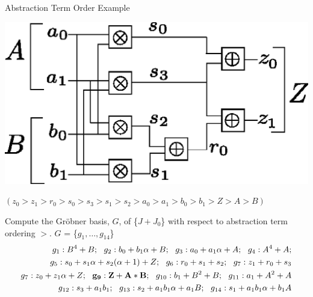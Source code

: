 \documentclass[xcolor=dvipsnames]{beamer}
\newcommand{\Grobner}{Gr\"{o}bner\xspace}
\begin{document}
\begin{frame}{\large{Abstraction Term Order Example}}

\centerline{
\includegraphics[scale=0.4]{2bitmult.eps}
}
{\bf $(z_0 > z_1 > r_0 > s_0 > s_3 > s_1 > s_2 > a_0 > a_1 >  b_0 > b_1 > Z > A > B)$}

Compute the \Grobner basis, $G$, of \{$J + J_0$\} with respect to abstraction term ordering $>$.
$G$ = \{$g_1, \dots, g_{14}$\}
\begin{align*}
g_1: B^4+B; ~~g_2: b_0+b_1 \alpha + B; ~~g_3: a_0+a_1 \alpha + A; ~~g_4: A^4+A; \nonumber \\
g_5: s_0+s_1 \alpha + s_2 (\alpha + 1) + Z; ~~g_6: r_0+s_1+s_2; ~~g_7: z_1+r_0+s_3 \nonumber \\
g_7: z_0+z_1 \alpha +Z; ~~{\bf g_9: Z+A*B} ; ~~g_{10}: b_1+B^2+B; ~~g_{11}: a_1+A^2+A \nonumber \\
g_{12}: s_3+a_1 b_1; ~~g_{13}: s_2+a_1 b_1 \alpha +a_1 B; ~~g_{14}: s_1+a_1 b_1 \alpha +b_1 A  \nonumber
\end{align*}

\end{frame}

\end{document}

